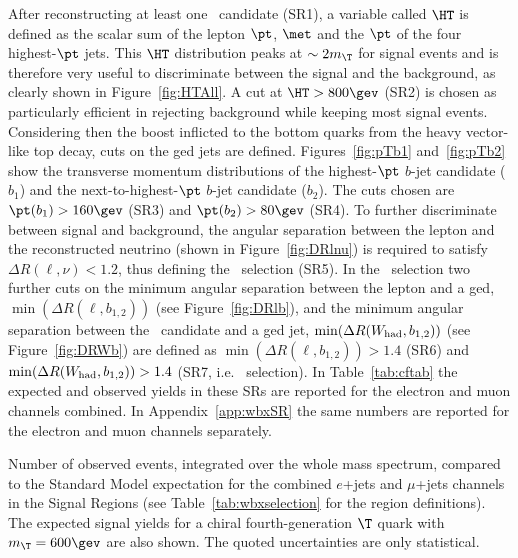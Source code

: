 After reconstructing at least one \whad\ candidate (SR1), a variable called $\HT$ is defined
as the scalar sum of the lepton $\pt$, $\met$ and the $\pt$
of the four  highest-$\pt$ jets. This $\HT$ distribution peaks at 
$\sim 2 m_{\T}$ for signal events and is therefore very useful to
discriminate between the signal and the background, as clearly shown
in Figure~\ref{fig:HTAll}. A cut at $\HT>800\gev$ (SR2) is chosen as particularly
efficient in rejecting background while keeping most signal events.
Considering then the boost inflicted to the bottom quarks from the heavy
vector-like top decay, cuts on the \btag ged jets are defined.
Figures~\ref{fig:pTb1} and~\ref{fig:pTb2} show the transverse momentum distributions
of the highest-$\pt$ $b$-jet candidate ($b_1$) and 
the next-to-highest-$\pt$ $b$-jet candidate ($b_2$).
The cuts chosen are $\pt(b_1) > 160\gev$ (SR3) and $\pt(b_2) >80\gev$ (SR4).
To further discriminate between signal and background,
the angular separation between the lepton and the reconstructed neutrino 
(shown in Figure~\ref{fig:DRlnu}) is
required to satisfy $\Delta R(\ell,\nu)<1.2$, thus defining the 
\loose\ selection (SR5). In the \tight\ selection
two further cuts on the minimum angular separation between the lepton and a \btag ged, 
$\min(\Delta R(\ell, b_{1,2}))$ (see Figure~\ref{fig:DRlb}), 
and the minimum angular separation between the
\whad\ candidate and a \btag ged jet,
$\min(\Delta R(W_{\rm had}, b_{1,2}))$ (see Figure~\ref{fig:DRWb}) are defined as
 $\min(\Delta R(\ell, b_{1,2}))>1.4$ (SR6) and 
$\min(\Delta R(W_{\rm had}, b_{1,2}))>1.4$ (SR7, i.e. \tight\ selection).
In Table~\ref{tab:cftab} the expected and observed yields in these SRs are
reported for the electron and muon channels combined. In Appendix~\ref{app:wbxSR}
the same numbers are reported for the  electron and muon channels separately.

\begin{table}[htb]\centering
        
        \caption{Number of observed events, integrated 
          over the whole mass spectrum, compared to the Standard Model expectation for
          the combined $e$+jets and $\mu$+jets channels 
          in the Signal Regions (see Table~\ref{tab:wbxselection} for the
        region definitions).
          The expected signal yields for a chiral 
          fourth-generation $\T$ quark with $m_{\T}=600\gev$ are also shown.
          The quoted uncertainties are only statistical.}\label{tab:cftab}
\end{table}



